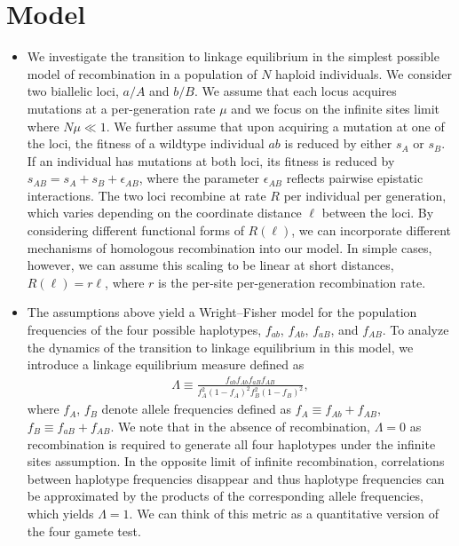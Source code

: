 \documentclass[aps,rmp,twocolumn,groupedaddress,floatfix,notitlepage]{revtex4-1}
\begin{document}
\section*{Model} 
\begin{itemize}
\item We investigate the transition to linkage equilibrium in the simplest possible model of recombination in a population of $N$ haploid individuals. We consider two biallelic loci, $a/A$ and $b/B$. We assume that each locus acquires mutations at a per-generation rate $\mu$ and we focus on the infinite sites limit where $N\mu \ll 1$. We further assume that upon acquiring a mutation at one of the loci, the fitness of a wildtype individual $ab$ is reduced by either $s_A$ or $s_B$. If an individual has mutations at both loci, its fitness is reduced by $s_{AB} = s_A + s_B + \epsilon_{AB}$, where the parameter $\epsilon_{AB}$ reflects pairwise epistatic interactions. The two loci recombine at rate $R$ per individual per generation, which varies depending on the coordinate distance $\ell$ between the loci. By considering different functional forms of $R(\ell)$, we can incorporate different mechanisms of homologous recombination into our model. In simple cases, however, we can assume this scaling to be linear at short distances, $R(\ell) = r\ell$, where $r$ is the per-site per-generation recombination rate. 

\item The assumptions above yield a Wright--Fisher model for the population frequencies of the four possible haplotypes, $f_{ab}$, $f_{Ab}$, $f_{aB}$, and $f_{AB}$. To analyze the dynamics of the transition to linkage equilibrium in this model, we introduce a linkage equilibrium measure defined as
\begin{align}\label{eq:lambda}
    \Lambda \equiv \frac{f_{ab}f_{Ab}f_{aB}f_{AB}}{f_A^2 (1-f_A)^2 f_B^2 (1-f_B)^2},
\end{align}
where $f_A$, $f_B$ denote allele frequencies defined as $f_A{\equiv}f_{Ab} + f_{AB}$, $f_B \equiv f_{aB} + f_{AB}$. We note that in the absence of recombination, $\Lambda = 0$ as recombination is required to generate all four haplotypes under the infinite sites assumption. In the opposite limit of infinite recombination, correlations between haplotype frequencies disappear and thus haplotype frequencies can be approximated by the products of the corresponding allele frequencies, which yields $\Lambda = 1$. We can think of this metric as a quantitative version of the four gamete test.


\end{itemize}
\end{document}
